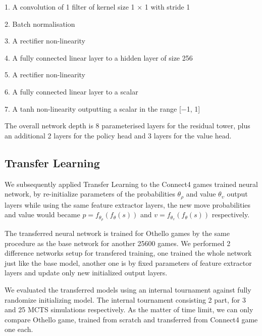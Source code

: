 \documentclass[12pt,a4paper]{article}
\begin{document}
1. A convolution of 1 filter of kernel size 1 × 1 with stride 1\par
2. Batch normalisation\par
3. A rectifier non-linearity\par
4. A fully connected linear layer to a hidden layer of size 256\par
5. A rectifier non-linearity\par
6. A fully connected linear layer to a scalar\par
7. A tanh non-linearity outputting a scalar in the range [−1, 1]\par
The overall network depth is 8 parameterised layers for the residual tower, plus an additional 2 layers for the policy head and 3 layers for the value head.
\subsection{Transfer Learning}
\hspace{0.6cm} We subsequently applied Transfer Learning to the Connect4 games trained neural network, by re-initialize parameters of the probabilities \(\theta_\rho\) and value \(\theta_\upsilon\) output layers while using the same feature extractor layers, the new move probabilities and value would became \(p = f_{\theta_\rho}(f_\theta(s))\) and \(v = f_{\theta_\upsilon}(f_\theta(s))\) respectively. \par
The transferred neural network is trained for Othello games by the same procedure as the base network for another 25600 games. We performed 2 difference networks setup for transfered training, one trained the whole network just like the base model, another one is by fixed parameters of feature extractor layers and update only new initialized output layers.\par
We evaluated the transferred models using an internal tournament against fully randomize initializing model. The internal tournament consisting 2 part, for 3 and 25 MCTS simulations respectively. As the matter of time limit, we can only compare Othello game, trained from scratch and transferred from Connect4 game one each.
\end{document}
